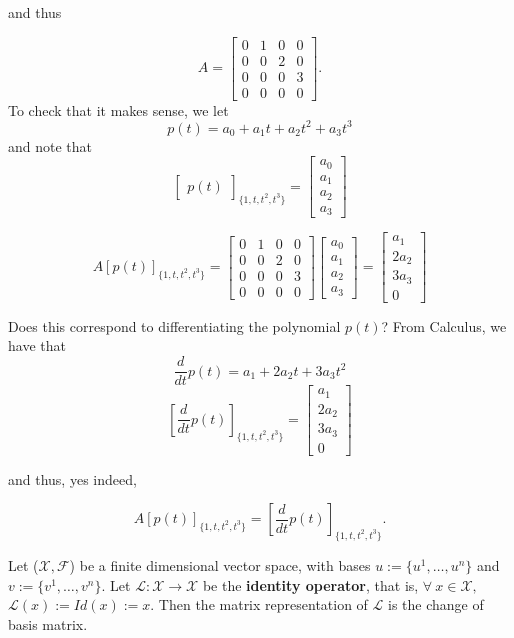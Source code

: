     and thus

    $$A = \begin{bmatrix}0 & 1 & 0 & 0 \\ 0 & 0 & 2 & 0 \\ 0 & 0 & 0 & 3 \\ 0 & 0 & 0 & 0  \end{bmatrix}. $$
To check that it makes sense, we let
    $$p(t) = a_0 + a_1 t + a_2 t^2 + a_3 t^3 $$
    and note that
    $$\begin{bmatrix}p(t)\end{bmatrix}_{ \{1, t, t^2, t^3\} } = \begin{bmatrix}a_0 \\ a_1 \\ a_2 \\ a_3  \end{bmatrix} $$

    $$ A [p(t)]_{ \{1, t, t^2, t^3\} } = \begin{bmatrix}0 & 1 & 0 & 0 \\ 0 & 0 & 2 & 0 \\ 0 & 0 & 0 & 3 \\ 0 & 0 & 0 & 0  \end{bmatrix} \begin{bmatrix}a_0 \\ a_1 \\ a_2 \\ a_3  \end{bmatrix} = \begin{bmatrix}a_1 \\ 2 a_2 \\ 3 a_3 \\ 0  \end{bmatrix} $$

    Does this correspond to differentiating the polynomial $p(t)$? From Calculus, we have that
    $$ \frac{d}{dt} p(t)  = a_1 + 2 a_2 t + 3 a_3 t^2 $$
    $$[\frac{d}{dt} p(t) ]_{ \{1, t, t^2, t^3\} } = \begin{bmatrix}a_1 \\ 2 a_2 \\ 3 a_3 \\ 0  \end{bmatrix}  $$

    and thus, yes indeed,

    $$ A [p(t)]_{ \{1, t, t^2, t^3\} } = [\frac{d}{dt}p(t)]_{ \{1, t, t^2, t^3\} }. $$
    \Qed
    
    
    
    \begin{example}
    Let ($\mathcal{X}, \mathcal{F}$) be a finite dimensional vector space, with bases $u:=\{u^1,  \ldots,u^n\}$ and $v:=\{v^1,  \ldots,v^n\}$. Let  $\mathcal{L}: \mathcal{X} \to \mathcal{X}$ be the \textbf{identity operator}, that is, $\forall~x \in \mathcal{X},$ $\mathcal{L}(x):=Id(x):=x$. Then the matrix representation of $\mathcal{L}$ is the change of basis matrix.
    \end{example}
    
